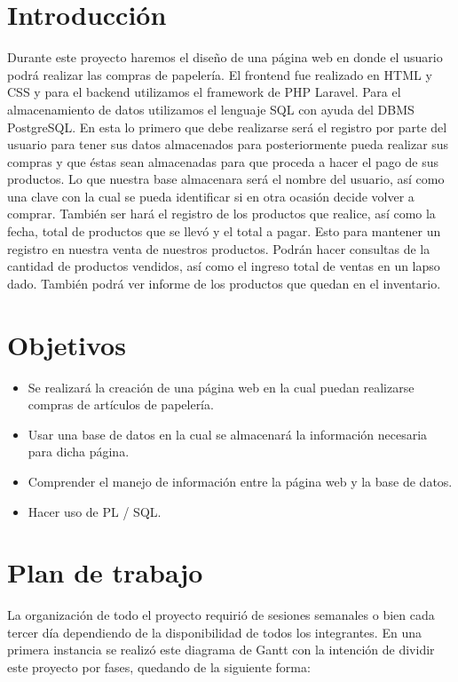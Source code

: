 \documentclass[letterpaper,12pt]{article}
\begin{document}
	\section{Introducción}
	Durante este proyecto haremos el diseño de una página web en donde el usuario podrá realizar las compras de papelería. El frontend fue realizado en HTML y CSS y para el backend utilizamos el framework de PHP Laravel. Para el almacenamiento de datos utilizamos el lenguaje SQL con ayuda del DBMS PostgreSQL.
	En esta lo primero que debe realizarse será el registro por parte del usuario para tener sus datos almacenados para posteriormente pueda realizar sus compras y que éstas sean almacenadas para que proceda a hacer el pago de sus productos. 
	Lo que nuestra base almacenara será el nombre del usuario, así como una clave con la cual se pueda identificar si en otra ocasión decide volver a comprar. También ser hará el registro de los productos que realice, así como la fecha, total de productos que se llevó y el total a pagar. Esto para mantener un registro en nuestra venta de nuestros productos.
	Podrán hacer consultas de la cantidad de productos vendidos, así como el ingreso total de ventas en un lapso dado. También podrá ver informe de los productos que quedan en el inventario.
	
	\section{Objetivos}
	\begin{itemize}
		\item Se realizará la creación de una página web en la cual puedan realizarse compras de artículos de papelería.
		\item Usar una base de datos en la cual se almacenará la información necesaria para dicha página.
		\item Comprender el manejo de información entre la página web y la base de datos.
		\item Hacer uso de PL / SQL.
	\end{itemize}
	
	\section{Plan de trabajo}
	
	La organización de todo el proyecto requirió de sesiones semanales o bien cada tercer día dependiendo de la disponibilidad de todos los integrantes. En una primera instancia se realizó este diagrama de Gantt con la intención de dividir este proyecto por fases, quedando de la siguiente forma:
	
\end{document}
